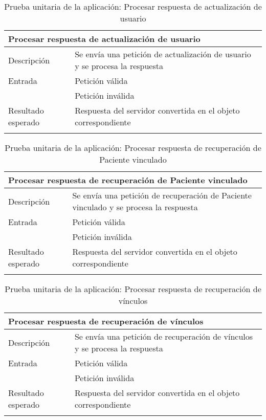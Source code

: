 \begin{longtable}{|p{} p{}|}
    \hline
    \multicolumn{2}{|l|}{\textbf{Procesar respuesta de actualización de usuario}} \\ \hline 
    Descripción                 & Se envía una petición de actualización de usuario y se procesa la respuesta \\ \hline
    Entrada                     & Petición válida \\
                                & Petición inválida \\ \hline
    Resultado esperado          & Respuesta del servidor convertida en el objeto correspondiente \\ \hline
    \caption{Prueba unitaria de la aplicación: Procesar respuesta de actualización de usuario}
    \label{cp:u:app:respuesta_actualizacion_usuario}
\end{longtable}

\vspace{-15pt}
\begin{longtable}{|p{} p{}|}
    \hline
    \multicolumn{2}{|l|}{\textbf{Procesar respuesta de recuperación de Paciente vinculado}} \\ \hline 
    Descripción                 & Se envía una petición de recuperación de Paciente vinculado y se procesa la respuesta \\ \hline
    Entrada                     & Petición válida \\
                                & Petición inválida \\ \hline
    Resultado esperado          & Respuesta del servidor convertida en el objeto correspondiente \\ \hline
    \caption{Prueba unitaria de la aplicación: Procesar respuesta de recuperación de Paciente vinculado}
    \label{cp:u:app:respuesta_recuperacion_paciente_vinculado}
\end{longtable}

\vspace{-15pt}
\begin{longtable}{|p{} p{}|}
    \hline
    \multicolumn{2}{|l|}{\textbf{Procesar respuesta de recuperación de vínculos}} \\ \hline 
    Descripción                 & Se envía una petición de recuperación de vínculos y se procesa la respuesta \\ \hline
    Entrada                     & Petición válida \\
                                & Petición inválida \\ \hline
    Resultado esperado          & Respuesta del servidor convertida en el objeto correspondiente \\ \hline
    \caption{Prueba unitaria de la aplicación: Procesar respuesta de recuperación de vínculos}
    \label{cp:u:app:respuesta_recuperacion_vinculos}
\end{longtable}

